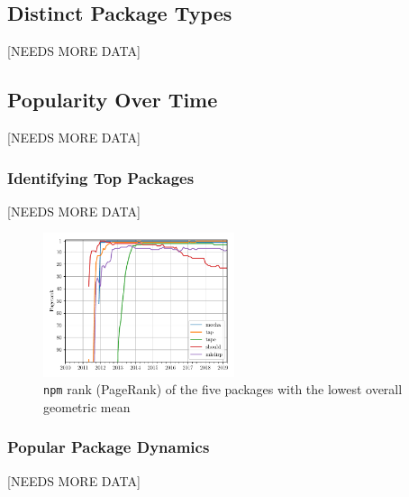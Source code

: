 \documentclass[10pt,conference]{IEEEtran}
\def\code#1{\texttt{#1}}
\begin{document}
  \subsection{Distinct Package Types}
  [NEEDS MORE DATA]

  \subsection{Popularity Over Time}
  [NEEDS MORE DATA]

  \subsubsection{Identifying Top Packages}
  [NEEDS MORE DATA]

  \begin{figure}
    \includegraphics[width=0.5\textwidth]{figures/geo_mean_highest_pagerank.pdf}
    \caption{\code{npm} rank (PageRank) of the five packages with the lowest overall geometric mean}
    \label{topFive}
  \end{figure}


  \subsubsection{Popular Package Dynamics}
  [NEEDS MORE DATA]
\end{document}
